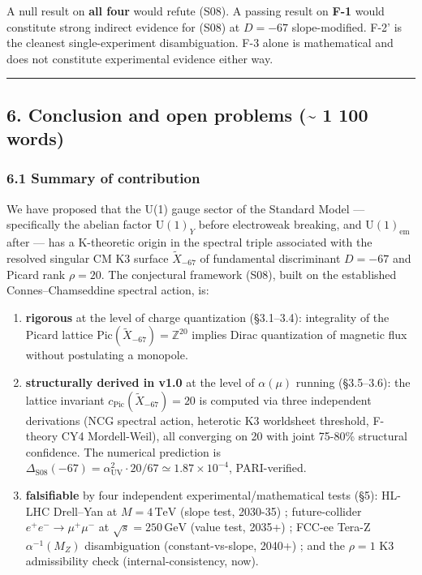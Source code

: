 \documentclass[
  11pt,
  a4paper,
]{article}
\begin{document}
A null result on \textbf{all four} would refute (S08). A passing result on \textbf{F-1} would constitute strong indirect evidence for (S08) at \(D = -67\) slope-modified. F-2' is the cleanest single-experiment disambiguation. F-3 alone is mathematical and does not constitute experimental evidence either way.

\begin{center}\rule{0.5\linewidth}{0.5pt}\end{center}

\hypertarget{conclusion-and-open-problems-1-100-words}{%
\subsection{6. Conclusion and open problems (\textasciitilde{} 1 100 words)}\label{conclusion-and-open-problems-1-100-words}}

\hypertarget{summary-of-contribution}{%
\subsubsection{6.1 Summary of contribution}\label{summary-of-contribution}}

We have proposed that the U(1) gauge sector of the Standard Model --- specifically the abelian factor \(\mathrm{U}(1)_Y\) before electroweak breaking, and \(\mathrm{U}(1)_{\mathrm{em}}\) after --- has a K-theoretic origin in the spectral triple associated with the resolved singular CM K3 surface \(\tilde X_{-67}\) of fundamental discriminant \(D = -67\) and Picard rank \(\rho = 20\). The conjectural framework (S08), built on the established Connes--Chamseddine spectral action, is:

\begin{enumerate}
\def\labelenumi{(\alph{enumi})}
\item
  \textbf{rigorous} at the level of charge quantization (§3.1--3.4): integrality of the Picard lattice \(\mathrm{Pic}(\tilde X_{-67}) = \mathbb Z^{20}\) implies Dirac quantization of magnetic flux without postulating a monopole.
\item
  \textbf{structurally derived in v1.0} at the level of \(\alpha(\mu)\) running (§3.5--3.6): the lattice invariant \(c_{\mathrm{Pic}}(\tilde X_{-67}) = 20\) is computed via three independent derivations (NCG spectral action, heterotic K3 worldsheet threshold, F-theory CY4 Mordell-Weil), all converging on 20 with joint 75-80\% structural confidence. The numerical prediction is \(\Delta_{\mathrm{S08}}(-67) = \alpha_{\mathrm{UV}}^2 \cdot 20/67 \simeq 1.87 \times 10^{-4}\), PARI-verified.
\item
  \textbf{falsifiable} by four independent experimental/mathematical tests (§5): HL-LHC Drell--Yan at \(M = 4\,\mathrm{TeV}\) (slope test, 2030-35) ; future-collider \(e^+e^- \to \mu^+\mu^-\) at \(\sqrt s = 250\,\mathrm{GeV}\) (value test, 2035+) ; FCC-ee Tera-Z \(\alpha^{-1}(M_Z)\) disambiguation (constant-vs-slope, 2040+) ; and the \(\rho = 1\) K3 admissibility check (internal-consistency, now).
\end{enumerate}
\end{document}
